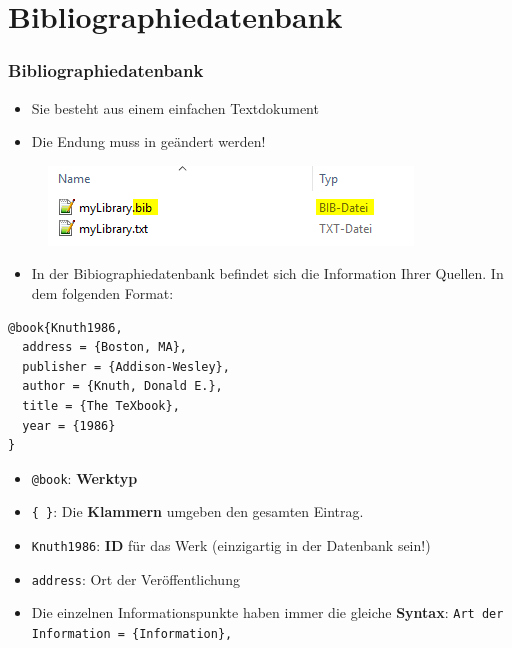 \section{Bibliographiedatenbank}

\begin{frame}[fragile]
\frametitle{Bibliographiedatenbank}

\begin{itemize}
	\item Sie besteht aus einem einfachen Textdokument
	
	\item  Die Endung  muss in \alert{}  geändert werden!
\end{itemize}

\begin{figure}
	\centering
	\includegraphics[width=.75\textwidth]{../../texfiles-beamer/tex-material/WissArb-latex/bib_txtDateien}
\end{figure}

\end{frame}

\begin{frame}[fragile]

\begin{itemize}
	\item In der Bibiographiedatenbank befindet sich die Information Ihrer Quellen. In dem folgenden Format: 
\end{itemize}

\begin{lstlisting}
@book{Knuth1986,
  address = {Boston, MA},
  publisher = {Addison-Wesley},
  author = {Knuth, Donald E.},
  title = {The TeXbook},
  year = {1986}
}
\end{lstlisting}

\pause

\begin{itemize}
	\item \lstinline|@book|: \textbf{Werktyp}
	\item \lstinline|{ }|: Die \textbf{Klammern} umgeben den gesamten Eintrag.
	\item \lstinline|Knuth1986|: \textbf{ID} für das Werk (\alert{einzigartig} in der Datenbank sein!)
	\item \lstinline|address|: Ort der Veröffentlichung
	\item Die einzelnen Informationspunkte haben immer die gleiche \textbf{Syntax}: \lstinline|Art der Information = {Information},|
\end{itemize}
\end{frame}


